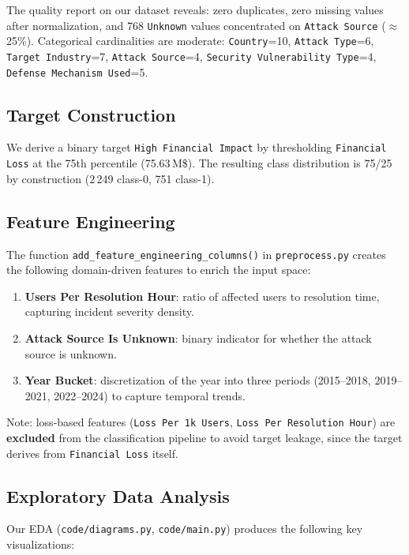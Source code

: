 \documentclass[a4paper,12pt]{article}
\begin{document}
The quality report on our dataset reveals: zero duplicates, zero missing values after normalization, and 768 \texttt{Unknown} values concentrated on \texttt{Attack Source} ($\approx$25\%). Categorical cardinalities are moderate: \texttt{Country}=10, \texttt{Attack Type}=6, \texttt{Target Industry}=7, \texttt{Attack Source}=4, \texttt{Security Vulnerability Type}=4, \texttt{Defense Mechanism Used}=5.

\subsection{Target Construction}

We derive a binary target \texttt{High Financial Impact} by thresholding \texttt{Financial Loss} at the 75th percentile (75.63\,M\$). The resulting class distribution is 75/25 by construction (2\,249 class-0, 751 class-1).

\subsection{Feature Engineering}

The function \texttt{add\_feature\_engineering\_columns()} in \texttt{preprocess.py} creates the following domain-driven features to enrich the input space:

\begin{enumerate}[leftmargin=2cm]
    \item \textbf{Users Per Resolution Hour}: ratio of affected users to resolution time, capturing incident severity density.
    \item \textbf{Attack Source Is Unknown}: binary indicator for whether the attack source is unknown.
    \item \textbf{Year Bucket}: discretization of the year into three periods (2015--2018, 2019--2021, 2022--2024) to capture temporal trends.
\end{enumerate}

Note: loss-based features (\texttt{Loss Per 1k Users}, \texttt{Loss Per Resolution Hour}) are \textbf{excluded} from the classification pipeline to avoid target leakage, since the target derives from \texttt{Financial Loss} itself.

\subsection{Exploratory Data Analysis}

Our EDA (\texttt{code/diagrams.py}, \texttt{code/main.py}) produces the following key visualizations:
\end{document}
